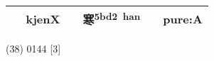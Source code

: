 \documentclass[14pt,a4paper]{scrartcl}
\begin{document}
\begin{longtable}[c]{@{}llllll@{}}
\begin{minipage}[t]{0.14\columnwidth}
𡫾
\strut\end{minipage} &
\begin{minipage}[t]{0.14\columnwidth}\raggedright\strut
kjenX
\strut\end{minipage} &
\begin{minipage}[t]{0.14\columnwidth}\raggedright\strut
\strut\end{minipage} &
\begin{minipage}[t]{0.14\columnwidth}\raggedright\strut
寒\textsuperscript{5bd2~han}
\strut\end{minipage} &
\begin{minipage}[t]{0.14\columnwidth}\raggedright\strut
\strut\end{minipage} &
\begin{minipage}[t]{0.14\columnwidth}\raggedright\strut
pure:A
\strut\end{minipage}\tabularnewline
\bottomrule
\end{longtable}

(38) 0144 {[}3{]}
\end{document}
